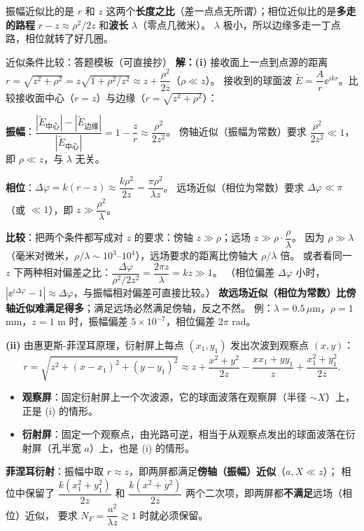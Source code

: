\begin{idea}[一句话看懂为什么相位更难]
振幅近似比的是 $r$ 和 $z$ 这两个\textbf{长度之比}（差一点点无所谓）；相位近似比的是\textbf{多走的路程} $r-z\approx\rho^2/2z$ 和\textbf{波长} $\lambda$（零点几微米）。
$\lambda$ 极小，所以边缘多走一丁点路，相位就转了好几圈。
\end{idea}

\begin{exam}{近似条件比较：答题模板（可直接抄）}
\textbf{解：(i)} 接收面上一点到点源的距离 $r=\sqrt{z^2+\rho^2}=z\sqrt{1+\rho^2/z^2}\approx z+\dfrac{\rho^2}{2z}$（$\rho\ll z$）。
接收到的球面波 $\tilde E=\dfrac{A}{r}\ee^{ikr}$。比较接收面中心（$r=z$）与边缘（$r=\sqrt{z^2+\rho^2}$）：

\textbf{振幅}：$\dfrac{|\tilde E_{\text{中心}}|-|\tilde E_{\text{边缘}}|}{|\tilde E_{\text{中心}}|}=1-\dfrac zr\approx\dfrac{\rho^2}{2z^2}$。
傍轴近似（振幅为常数）要求 $\dfrac{\rho^2}{2z^2}\ll1$，即 $\rho\ll z$，与 $\lambda$ 无关。

\textbf{相位}：$\Delta\varphi=k(r-z)\approx\dfrac{k\rho^2}{2z}=\dfrac{\pi\rho^2}{\lambda z}$。
远场近似（相位为常数）要求 $\Delta\varphi\ll\pi$（或 $\ll1$），即 $z\gg\dfrac{\rho^2}{\lambda}$。

\textbf{比较}：把两个条件都写成对 $z$ 的要求：傍轴 $z\gg\rho$；远场 $z\gg\rho\cdot\dfrac{\rho}{\lambda}$。
因为 $\rho\gg\lambda$（毫米对微米，$\rho/\lambda\sim10^3$–$10^4$），远场要求的距离比傍轴大 $\rho/\lambda$ 倍。
或者看同一 $z$ 下两种相对偏差之比：$\dfrac{\Delta\varphi}{\rho^2/2z^2}=\dfrac{2\pi z}{\lambda}=kz\gg1$。
（相位偏差 $\Delta\varphi$ 小时，$|\ee^{i\Delta\varphi}-1|\approx\Delta\varphi$，与振幅相对偏差可直接比较。）
\textbf{故远场近似（相位为常数）比傍轴近似难满足得多}；满足远场必然满足傍轴，反之不然。
例：$\lambda=0.5\,\mu$m，$\rho=1$ mm，$z=1$ m 时，振幅偏差 $5\times10^{-7}$，相位偏差 $2\pi$ rad。

\textbf{(ii)} 由惠更斯-菲涅耳原理，衍射屏上每点 $(x_1,y_1)$ 发出次波到观察点 $(x,y)$：
\[
r=\sqrt{z^2+(x-x_1)^2+(y-y_1)^2}\approx z+\frac{x^2+y^2}{2z}-\frac{xx_1+yy_1}{z}+\frac{x_1^2+y_1^2}{2z}.
\]
\begin{itemize}
\item \textbf{观察屏}：固定衍射屏上一个次波源，它的球面波落在观察屏（半径 $\sim X$）上，正是 (i) 的情形。
\item \textbf{衍射屏}：固定一个观察点，由光路可逆，相当于从观察点发出的球面波落在衍射屏（孔半宽 $a$）上，也是 (i) 的情形。
\end{itemize}
\textbf{菲涅耳衍射}：振幅中取 $r\approx z$，即两屏都满足\textbf{傍轴（振幅）近似}（$a,X\ll z$）；
相位中保留了 $\dfrac{k(x_1^2+y_1^2)}{2z}$ 和 $\dfrac{k(x^2+y^2)}{2z}$ 两个二次项，即两屏都\textbf{不满足}远场（相位）近似，
要求 $N_F=\dfrac{a^2}{\lambda z}\gtrsim1$ 时就必须保留。


\end{exam}
